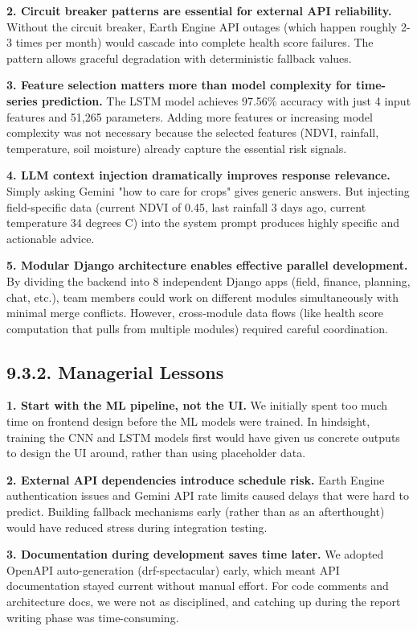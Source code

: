 \documentclass[12pt, a4paper]{report}
\begin{document}
\textbf{2. Circuit breaker patterns are essential for external API reliability.} Without the circuit breaker, Earth Engine API outages (which happen roughly 2-3 times per month) would cascade into complete health score failures. The pattern allows graceful degradation with deterministic fallback values.

\textbf{3. Feature selection matters more than model complexity for time-series prediction.} The LSTM model achieves 97.56\% accuracy with just 4 input features and 51,265 parameters. Adding more features or increasing model complexity was not necessary because the selected features (NDVI, rainfall, temperature, soil moisture) already capture the essential risk signals.

\textbf{4. LLM context injection dramatically improves response relevance.} Simply asking Gemini "how to care for crops" gives generic answers. But injecting field-specific data (current NDVI of 0.45, last rainfall 3 days ago, current temperature 34 degrees C) into the system prompt produces highly specific and actionable advice.

\textbf{5. Modular Django architecture enables effective parallel development.} By dividing the backend into 8 independent Django apps (field, finance, planning, chat, etc.), team members could work on different modules simultaneously with minimal merge conflicts. However, cross-module data flows (like health score computation that pulls from multiple modules) required careful coordination.

\subsection{9.3.2. Managerial Lessons}
\textbf{1. Start with the ML pipeline, not the UI.} We initially spent too much time on frontend design before the ML models were trained. In hindsight, training the CNN and LSTM models first would have given us concrete outputs to design the UI around, rather than using placeholder data.

\textbf{2. External API dependencies introduce schedule risk.} Earth Engine authentication issues and Gemini API rate limits caused delays that were hard to predict. Building fallback mechanisms early (rather than as an afterthought) would have reduced stress during integration testing.

\textbf{3. Documentation during development saves time later.} We adopted OpenAPI auto-generation (drf-spectacular) early, which meant API documentation stayed current without manual effort. For code comments and architecture docs, we were not as disciplined, and catching up during the report writing phase was time-consuming.
\end{document}
